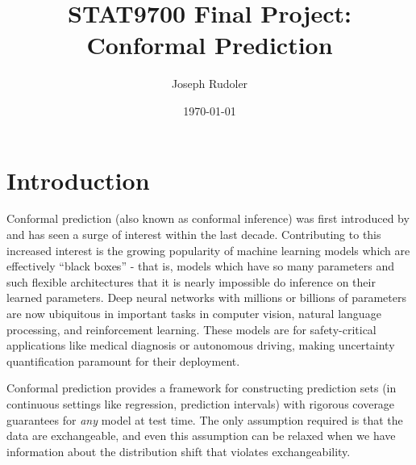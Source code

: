 \documentclass[a4paper, 12pt]{article}
\title{STAT9700 Final Project: Conformal Prediction}
\author{Joseph Rudoler}
\date{\today}
\begin{document}
\maketitle

\newpage
\tableofcontents

\newpage
\section{Introduction}
\label{sec:intro}
Conformal prediction (also known as conformal inference) was first introduced by \textcite{vovkMachineLearningApplicationsAlgorithmic1999} and has seen a surge of interest within the last decade. Contributing to this increased interest is the growing popularity of machine learning models which are effectively ``black boxes'' - that is, models which have so many parameters and such flexible architectures that it is nearly impossible do inference on their learned parameters. Deep neural networks with millions or billions of parameters are now ubiquitous in important tasks in computer vision, natural language processing, and reinforcement learning. These models are for safety-critical applications like medical diagnosis or autonomous driving, making uncertainty quantification paramount for their deployment.

Conformal prediction provides a framework for constructing prediction sets (in continuous settings like regression, prediction intervals) with rigorous coverage guarantees for \textit{any} model at test time. The only assumption required is that the data are exchangeable, and even this assumption can be relaxed when we have information about the distribution shift that violates exchangeability.
\end{document}
